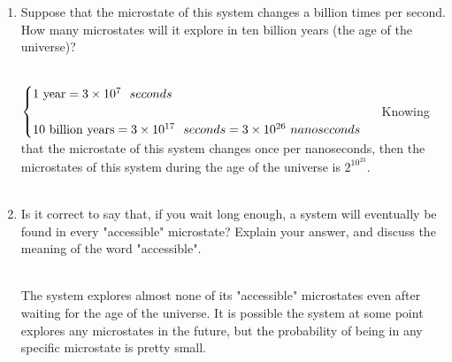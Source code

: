 \documentclass[fleqn]{article}
\begin{document}
\begin{enumerate}
\begin{enumerate}
      \item Suppose that the microstate of this system changes a billion times per second. How many microstates will it
      explore in ten billion years (the age of the universe)?

        \textcolor{hwColor}{
          \\
          $
            \begin{cases}
              \text{1 year}=3 \times 10^7 ~~ seconds
              \\
              \\
              \text{10 billion years}=3 \times 10^{17} ~~ seconds=3 \times 10^{26} ~ nanoseconds
            \end{cases}
            \\
            \\
          $
          Knowing that the microstate of this system changes once per nanoseconds, then the microstates of this system during 
          the age of the universe is $2^{{10}^{23}}$.
          \\
          \\
        }

      \item Is it correct to say that, if you wait long enough, a system will eventually be found in every "accessible" microstate?
      Explain your answer, and discuss the meaning of the word "accessible".

        \textcolor{hwColor}{
          \\
          The system explores almost none of its "accessible" microstates even after waiting for the age of the universe. 
          It is possible the system at some point explores any microstates in the future, but the probability of being in any
          specific microstate is pretty small.
          \\
        }
        
    \end{enumerate}
  \end{enumerate}
\end{document}
